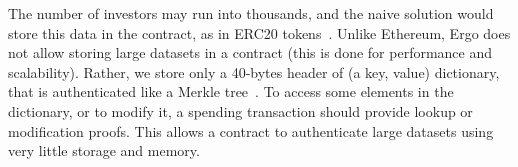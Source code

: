 \documentclass[runningheads]{llncs}
\begin{document}
The number of investors may run into thousands, and the naive solution would store this data in the contract, as in ERC20 tokens~\cite{erc20}. 
Unlike Ethereum, Ergo does not allow storing large datasets in a contract (this is done for performance and scalability). Rather, we store only a 40-bytes header of (a key, value) dictionary, that is authenticated like a Merkle tree~\cite{RMCI17}. To access some elements in the dictionary, or to modify it, a spending transaction should provide lookup or modification proofs. This allows a contract to authenticate large datasets using very little storage and memory. 
\end{document}
